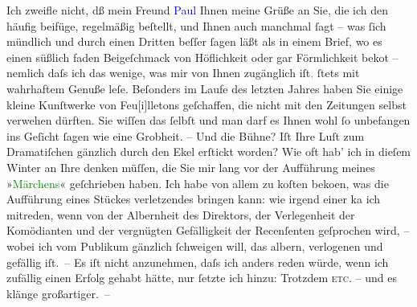\pstart
           Ich zweifle nicht, dß mein Freund \textcolor{blue}{Paul}\ledrightnote{\textcolor{blue}{Paul Goldmann}} Ihnen
               meine Grüße \introOben{}an Sie,\introOben{} die ich den \label{K_L03908-2v}\label{K_L03908-2} häufig beifüge, regelmäßig beſtellt,
               und {\pb}Ihnen auch manchmal ſagt – was ſich mündlich und durch
               einen Dritten beſſer ſagen läßt als in einem Brief, wo es einen süßlich faden
               Beigeſchmack von Höflichkeit oder gar Förmlichkeit beko{\geminationm}t – nemlich daſs ich das wenige, was mir von Ihnen zugänglich iſt\textcolor{gray}{,} ſtets mit
               wahrhaftem Genuße leſe. Beſonders im Laufe des letzten Jahres haben Sie einige kleine
               Kunſtwerke {\pb}von Feu{[}i{]}lletons
               geſchaffen, die nicht mit den Zeitungen selbst verwehen dürften. Sie wiſſen das
               ſelbſt und man darf es Ihnen wohl ſo unbefangen ins Geſicht ſagen wie eine Grobheit.
               – Und die Bühne? Iſt Ihre Luſt zum Dramatiſchen gänzlich durch den Ekel erſtickt
               worden? Wie oft hab’ ich in dieſem Winter an Ihre \label{K_L03908-3v}\label{K_L03908-3} denken müſſen, die Sie mir
               lang vor der Aufführung meines »\textcolor{green}{Märchens}\ledrightnote{\textcolor{green}{Das Märchen. Schauspiel in drei Aufzügen}}«
               geſchrieben haben. {\pb}Ich habe von allem zu koſten beko{\geminationm}en, was die Aufführung eines Stückes verletzendes
               bringen kann: wie irgend einer ka{\geminationn} ich mitreden, wenn
               von der Albernheit des Direktors, der Verlegenheit der Komödianten und der vergnügten
               Gefälligkeit der Recenſenten geſprochen wird, – wobei ich vom Publikum gänzlich
               ſchweigen will, das albern, verlogenen und gefällig iſt. – Es iſt nicht anzunehmen,
               daſs ich anders reden würde, wenn {\pb}ich zufällig einen
               Erfolg gehabt hätte, nur ſetzte ich hinzu: Trotzdem{\dotsfour}{ }\textsc{etc.} – und es klänge großartiger. –\pend
           
